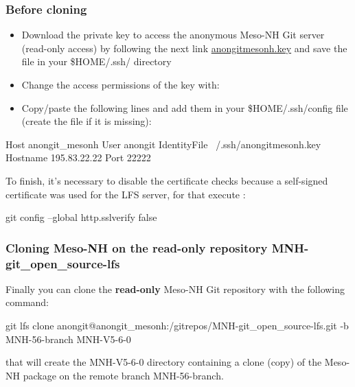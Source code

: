 \subsubsection{Before cloning}

\begin{itemize}
\item Download the private key to access the anonymous Meso-NH Git server (read-only access) by following the next link \href{http://mesonh.aero.obs-mip.fr/mesonh56/GitSources?action=AttachFile&do=get&target=anongitmesonh.key}{anongitmesonh.key} and save the file in your \$HOME/.ssh/ directory
\item Change the access permissions of the key with:
\end{itemize}
\begin{itemize}
\item Copy/paste the following lines and add them in your \$HOME/.ssh/config file (create the file if it is missing):
\end{itemize}
\begin{bashcode}
Host anongit_mesonh
  User anongit
  IdentityFile ~/.ssh/anongitmesonh.key
  Hostname 195.83.22.22
  Port 22222
\end{bashcode}

To finish, it's necessary to disable the certificate checks because a self-signed certificate was used for the LFS server, for that execute :
\begin{bashcode}
git config --global http.sslverify false
\end{bashcode}

\subsubsection{Cloning Meso-NH on the read-only repository MNH-git\_open\_source-lfs}

Finally you can clone the \textbf{read-only} Meso-NH Git repository with the following command:
\begin{bashcode}
git lfs clone anongit@anongit_mesonh:/gitrepos/MNH-git_open_source-lfs.git -b MNH-56-branch MNH-V5-6-0
\end{bashcode}

that will create the MNH-V5-6-0 directory containing a clone (copy) of the Meso-NH package on the remote branch MNH-56-branch.

